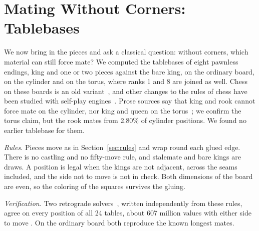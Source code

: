 \section{Mating Without Corners: Tablebases}\label{sec:tb}

We now bring in the pieces and ask a classical question: without corners, which material can still force
mate? We computed the tablebases of eight pawnless endings, king and one or two pieces against the bare
king, on the ordinary board, on the cylinder and on the torus, where ranks 1 and 8 are joined as well. Chess
on these boards is an old variant~\cite{Pritchard}, and other changes to the rules of chess have been studied with
self-play engines~\cite{Tomasev2022}. Prose sources say that king and rook cannot force mate
on the cylinder, nor king and queen on the torus~\cite{WikiCylinder,HGMCylinder}; we confirm the torus claim,
but the rook mates from 2.80\% of cylinder positions. We found no earlier tablebase for them.

\emph{Rules.} Pieces move as in Section~\ref{sec:rules} and wrap round each glued edge. There is no castling
and no fifty-move rule, and stalemate and bare kings are draws. A position is legal when the kings are not
adjacent, across the seams included, and the side not to move is not in check. Both dimensions of the board
are even, so the coloring of the squares survives the gluing.

\emph{Verification.} Two retrograde solvers~\cite{Thompson1986}, written independently from these rules, agree on every position
of all 24 tables, about 607 million values with either side to move . On the ordinary board both
reproduce the known longest mates.

